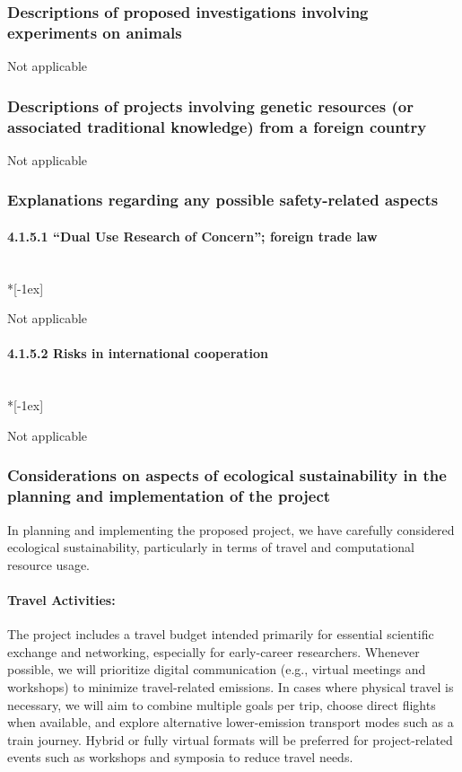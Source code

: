 \documentclass[11pt,a4paper,twoside]{scrartcl}
\begin{document}
\subsubsection{Descriptions of proposed investigations involving experiments on 
animals}
\qquad \quad Not applicable

\subsubsection{Descriptions of projects involving genetic resources (or 
associated traditional knowledge) from a foreign country}
\qquad \quad Not applicable

\subsubsection{Explanations regarding any possible safety-related aspects}

\paragraph{4.1.5.1 “Dual Use Research of Concern”; foreign trade 
law}~\\*[-1ex]

\qquad \quad Not applicable

\paragraph{4.1.5.2 Risks in international cooperation}~\\*[-1ex]

\qquad \quad Not applicable

\subsubsection{Considerations on aspects of ecological sustainability in the 
planning and implementation of the project}

In planning and implementing the proposed project, we have carefully
considered ecological sustainability, particularly in terms of travel
and computational resource usage.

\paragraph{Travel Activities:}

The project includes a travel budget intended primarily for essential
scientific exchange and networking, especially for early-career
researchers. Whenever possible, we will prioritize digital
communication (e.g., virtual meetings and workshops) to minimize
travel-related emissions. In cases where physical travel is necessary,
we will aim to combine multiple goals per trip, choose direct flights
when available, and explore alternative lower-emission transport modes
such as a train journey. Hybrid or fully virtual formats will be
preferred for project-related events such as workshops and symposia to
reduce travel needs.
\end{document}
